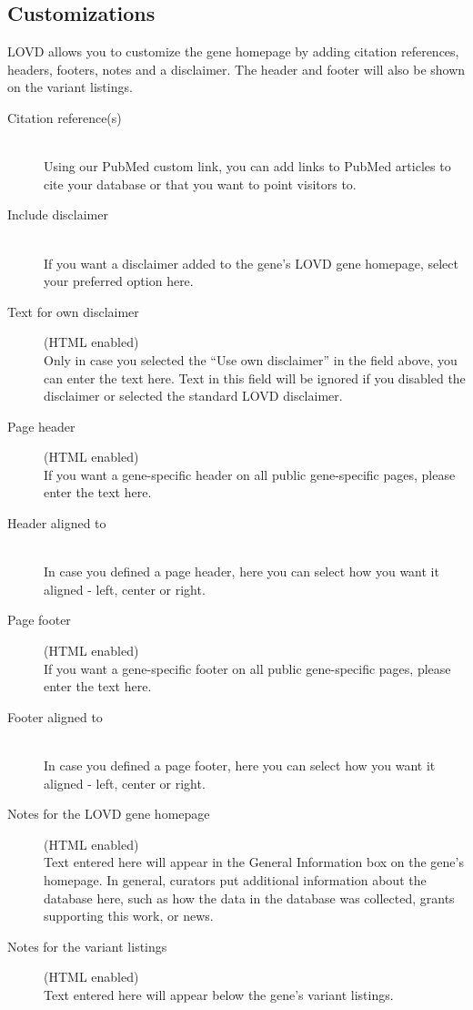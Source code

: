 \documentclass[a4paper,oneside,openany,12pt]{memoir}
\begin{document}
\subsection{Customizations}
LOVD allows you to customize the gene homepage by adding citation references, headers, footers, notes and a disclaimer.
The header and footer will also be shown on the variant listings.
\begin{description}
  \item[Citation reference(s)] \hfill \\
  Using our PubMed custom link, you can add links to PubMed articles to cite your database or that you want to point visitors to.
  \item[Include disclaimer] \hfill \\
  If you want a disclaimer added to the gene's LOVD gene homepage, select your preferred option here.
  \item[Text for own disclaimer] (HTML enabled)\hfill \\
  Only in case you selected the ``Use own disclaimer'' in the field above, you can enter the text here.
  Text in this field will be ignored if you disabled the disclaimer or selected the standard LOVD disclaimer.
  \item[Page header] (HTML enabled) \hfill \\
  If you want a gene-specific header on all public gene-specific pages, please enter the text here.
  \item[Header aligned to] \hfill \\
  In case you defined a page header, here you can select how you want it aligned - left, center or right.
  \item[Page footer] (HTML enabled) \hfill \\
  If you want a gene-specific footer on all public gene-specific pages, please enter the text here.
  \item[Footer aligned to] \hfill \\
  In case you defined a page footer, here you can select how you want it aligned - left, center or right.
  \item[Notes for the LOVD gene homepage] (HTML enabled) \hfill \\
  Text entered here will appear in the General Information box on the gene's homepage.
  In general, curators put additional information about the database here,
   such as how the data in the database was collected, grants supporting this work, or news.
  \item[Notes for the variant listings] (HTML enabled) \hfill \\
  Text entered here will appear below the gene's variant listings.
\end{description}
\end{document}
